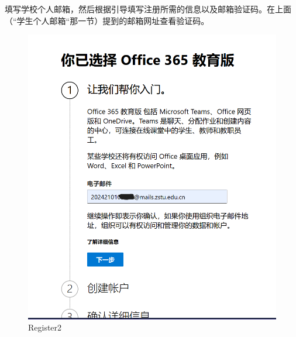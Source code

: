 \documentclass[]{ctexbook}
\theoremstyle{definition}
\theoremstyle{definition}
\theoremstyle{definition}
\theoremstyle{definition}
\theoremstyle{remark}
\begin{document}
填写学校个人邮箱，然后根据引导填写注册所需的信息以及邮箱验证码。在上面（``学生个人邮箱``那一节）提到的邮箱网址查看验证码。

\begin{figure}

{\centering \includegraphics[width=0.8\linewidth]{img/OneDrive/Register_2} 

}

\caption{Register2}\label{fig:OneDrive-Register2}
\end{figure}
\end{document}
